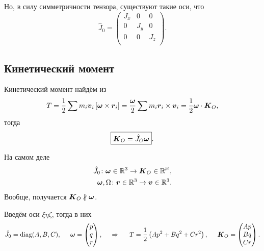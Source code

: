 Но, в силу симметричности тензора, существуют такие оси, что
\begin{equation}
    \hat J_0 = \begin{pmatrix}
        J_x & 0 & 0 \\
        0 & J_y & 0 \\
        0 & 0 & J_z \\
    \end{pmatrix}.
\end{equation}

\subsection{Кинетический момент}


Кинетический момент найдём из
\begin{equation}
    T = \frac{1}{2} \sum m_i \mbox{\boldmath $v$}_i \left[\mbox{\boldmath $\omega$} \times \mbox{\boldmath $r$}_i\right]
    =
    \frac{\mbox{\boldmath $\omega$}}{2} \sum m_i \mbox{\boldmath $r$}_i \times \mbox{\boldmath $v$}_i = 
    \frac{1}{2} \mbox{\boldmath $\omega$} \cdot \mbox{\boldmath $K$}_O,
\end{equation}
тогда
\begin{equation}
    \boxed{
        \mbox{\boldmath $K$}_O = \hat J_O \mbox{\boldmath $\omega$}
    }.
\end{equation}

На самом деле
\begin{align*}
    \hat J_0 \colon \mbox{\boldmath $\omega$} \in \mathbb{R}^3 \to \mbox{\boldmath $K$}_O \in \mathbb{R^3}, \\
    \mbox{\boldmath $\omega$}, \Omega \colon \mbox{\boldmath $r$} \in \mathbb{R}^3 \to \mbox{\boldmath $v$} \in \mathbb{R}^3.
\end{align*}
Вообще, получается $\mbox{\boldmath $K$}_O \nparallel \mbox{\boldmath $\omega$}$.


Введём оси $\xi\eta\zeta$, тогда в них
\begin{equation}
    \hat{J}_0 = \mathop{\mathrm{diag}}\nolimits (A, B, C),
    \hspace{0.5cm} 
    \mbox{\boldmath $\omega$} = \begin{pmatrix}
        p \\ q \\ r
    \end{pmatrix},
    \hspace{0.5cm} \Rightarrow \hspace{0.5cm} 
    T = \frac{1}{2} \left(
        Ap^2 + B q^2 + C r^2
    \right),
    \hspace{0.5cm} 
    \mbox{\boldmath $K$}_O = \begin{pmatrix}
        Ap \\ Bq \\ Cr
    \end{pmatrix}.
\end{equation}


